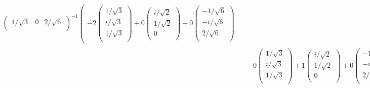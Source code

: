 \documentclass[dvipdfmx]{jsarticle}
\begin{document}
\begin{align*}
\begin{pmatrix}
{1}/{\sqrt{3}} & 0 & {2}/{\sqrt{6}} \\
\end{pmatrix}^{- 1} \left( \begin{matrix} - 2\begin{pmatrix}
{1}/{\sqrt{3}} \\
{i}/{\sqrt{3}} \\
{1}/{\sqrt{3}} \\
\end{pmatrix} + 0\begin{pmatrix}
{i}/{\sqrt{2}} \\
{1}/{\sqrt{2}} \\
0 \\
\end{pmatrix} + 0\begin{pmatrix}
 - {1}/{\sqrt{6}} \\
 - {i}/{\sqrt{6}} \\
{2}/{\sqrt{6}} \\
\end{pmatrix} \end{matrix} \right.\\
&\quad \left. \begin{matrix} 0\begin{pmatrix}
{1}/{\sqrt{3}} \\
{i}/{\sqrt{3}} \\
{1}/{\sqrt{3}} \\
\end{pmatrix} + 1\begin{pmatrix}
{i}/{\sqrt{2}} \\
{1}/{\sqrt{2}} \\
0 \\
\end{pmatrix} + 0\begin{pmatrix}
 - {1}/{\sqrt{6}} \\
 - {i}/{\sqrt{6}} \\
{2}/{\sqrt{6}} \\
\end{pmatrix} & 0\begin{pmatrix}
{1}/{\sqrt{3}} \\
{i}/{\sqrt{3}} \\
{1}/{\sqrt{3}} \\
\end{pmatrix} + 0\begin{pmatrix}
{i}/{\sqrt{2}} \\
{1}/{\sqrt{2}} \\
0 \\
\end{pmatrix} + 1\begin{pmatrix}

\end{pmatrix}
\end{matrix}
\end{align*}
\end{document}

